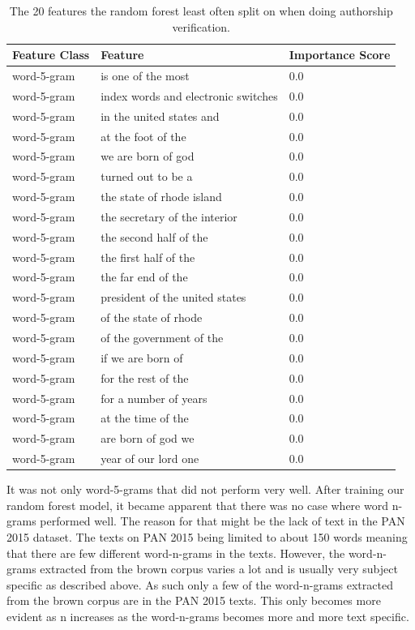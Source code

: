 \begin{table}
    \centering
    \begin{tabular}{lll}
        \textbf{Feature Class} & \textbf{Feature} & \textbf{Importance Score} \\
        \hline
        word-5-gram & is one of the most & 0.0 \\
        word-5-gram & index words and electronic switches & 0.0 \\
        word-5-gram & in the united states and & 0.0 \\
        word-5-gram & at the foot of the & 0.0 \\
        word-5-gram & we are born of god & 0.0 \\
        word-5-gram & turned out to be a & 0.0 \\
        word-5-gram & the state of rhode island & 0.0 \\
        word-5-gram & the secretary of the interior & 0.0 \\
        word-5-gram & the second half of the & 0.0 \\
        word-5-gram & the first half of the & 0.0 \\
        word-5-gram & the far end of the & 0.0 \\
        word-5-gram & president of the united states & 0.0 \\
        word-5-gram & of the state of rhode & 0.0 \\
        word-5-gram & of the government of the & 0.0 \\
        word-5-gram & if we are born of & 0.0 \\
        word-5-gram & for the rest of the & 0.0 \\
        word-5-gram & for a number of years & 0.0 \\
        word-5-gram & at the time of the & 0.0 \\
        word-5-gram & are born of god we & 0.0 \\
        word-5-gram & year of our lord one & 0.0
    \end{tabular}
    \caption{The 20 features the random forest least often split on when doing
    authorship verification.}
    \label{tab:feature_non_importance}
\end{table}

It was not only word-5-grams that did not perform very well. After training
our random forest model, it became apparent that there was no case where word
n-grams performed well. The reason for that might be the lack of text in the PAN
2015 dataset. The texts on PAN 2015 being limited to about 150 words meaning
that there are few different word-n-grams in the texts. However, the
word-n-grams extracted from the brown corpus varies a lot and is usually very
subject specific as described above. As such only a few of the word-n-grams
extracted from the brown corpus are in the PAN 2015 texts. This only becomes
more evident as n increases as the word-n-grams becomes more and more text
specific.

